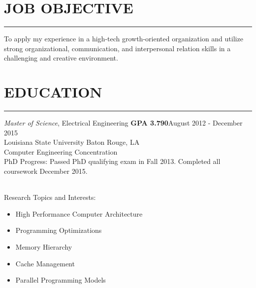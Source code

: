 \documentclass{res}
\begin{document}
 

\address{Woodlawn Court, Panama City Beach, FL 32407}     %

                                  
\begin{resume}

\section{JOB OBJECTIVE}
	\rule{\textwidth}{0.5pt}
    To apply my experience in a high-tech growth-oriented organization and utilize strong organizational, communication, and interpersonal relation skills in a challenging and creative environment.      
    
\section{EDUCATION}
	\rule{\textwidth}{0.5pt}
	\vspace{-0.3in} 
	
	{\sl Master of Science}, Electrical Engineering {\bf GPA 3.790}\hfill August 2012 - December 2015\\ 
	Louisiana State University \hfill Baton Rouge, LA\\   
	{\footnotesize Computer Engineering Concentration\\
	PhD Progress: Passed PhD qualifying exam in Fall 2013. Completed all coursework  December 2015.}\\\\
	\vspace{-0.49in}
	\begin{multicols}{2}
	{\footnotesize 
		Research Topics and Interests: \vspace{-0.175in}
		\begin{itemize}
			\item High Performance Computer Architecture
			\item Programming Optimizations
			\item Memory Hierarchy
			\item Cache Management
			\item Parallel Programming Models 
			\end{itemize}
		
}
\end{multicols}
\end{resume}
\end{document}
